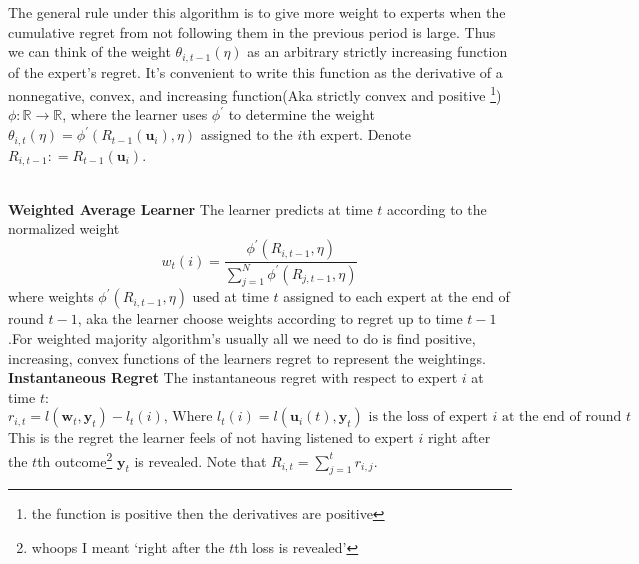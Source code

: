 \documentclass[11pt]{article}
\theoremstyle{quest}
\newcommand{\R}{\mathbb{R}}
\begin{document}
The general rule under this algorithm is to give more weight to experts when the cumulative regret from not following them in the previous period is large. Thus we can think of the weight $\theta_{i,t-1}(\eta)$ as an arbitrary strictly increasing function of the expert's regret. It's convenient to write this function as the derivative of a nonnegative, convex, and increasing function(Aka strictly convex and positive \footnote{the function is positive then the derivatives are positive})  $\phi:\R\rightarrow \R$, where the learner uses $\phi^\prime$ to determine the weight $ \theta_{i,t}(\eta)= \phi^\prime(R_{t-1}(\mathbf{u}_i),\eta)$  assigned to the $i$th expert. Denote $R_{i,t-1} : = R_{t-1}(\mathbf{u}_i)$.
\\ \\ 
\begin{tcolorbox}
\textbf{Weighted Average Learner} 
The learner predicts at time $t$ according to the normalized weight
\begin{equation} \label{eq:WAL} w_t(i) = \frac{\phi^\prime(R_{i,t-1},\eta)}{\sum_{j=1}^N \phi^\prime(R_{j,t-1},\eta)}\end{equation} where weights $\phi^\prime(R_{i,t-1},\eta)$ used at time $t$ assigned to each expert at the end of round $t-1$, aka the learner choose weights according to regret up to time $t-1$.For weighted majority algorithm's usually all we need to do is find positive, increasing, convex functions of the learners regret to represent the weightings. \\ 
\textbf{Instantaneous Regret }\label{instant_regret} The instantaneous regret with respect to expert $i$ at time $t$:
\[r_{i,t} = l(\mathbf{w}_t,\mathbf{y}_t)-l_t(i) \text{, Where } l_t(i) = l(\mathbf{u}_i(t),\mathbf{y}_t) \text{ is the loss of expert $i$ at the end of round $t$}\] This is the regret the learner feels of not having listened to expert $i$ right after the $t$th outcome\footnote{whoops I meant `right after the $t$th loss is revealed'} $\mathbf{y}_t$ is revealed. Note that $ R_{i,t}=\sum_{j=1}^t r_{i,j}$.\\
\end{tcolorbox}
\end{document}
